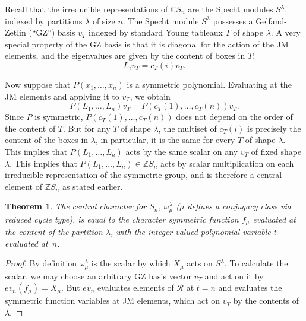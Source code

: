 \documentclass[10pt]{article}
\newtheorem{theorem}{Theorem}[section]
\theoremstyle{definition}
\begin{document}
Recall that the irreducible representations of $\mathbb{C}S_n$ are the Specht modules $S^\lambda$, indexed by partitions $\lambda$ of size $n$. The Specht module $S^\lambda$ possesses a Gelfand-Zetlin (``GZ'') basis $v_T$ indexed by standard Young tableaux $T$ of shape $\lambda$. A very special property of the GZ basis is that it is diagonal for the action of the JM elements, and the eigenvalues are given by the content of boxes in $T$:
\[
L_i v_T = c_T(i) v_T.
\]

Now suppose that $P(x_1, \ldots, x_n)$ is a symmetric polynomial. Evaluating at the JM elements and applying it to $v_T$, we obtain
\[
P(L_1, \ldots, L_n)v_T = P(c_T(1), \ldots, c_T(n))v_T.
\]
Since $P$ is symmetric, $P(c_T(1), \ldots, c_T(n))$ does not depend on the order of the content of $T$. But for any $T$ of shape $\lambda$, the multiset of $c_T(i)$ is precisely the content of the boxes in $\lambda$, in particular, it is the same for every $T$ of shape $\lambda$. This implies that $P(L_1, \ldots, L_n)$ acts by the same scalar on any $v_T$ of fixed shape $\lambda$. This implies that $P(L_1, \ldots, L_n) \in \mathbb{Z}S_n$ acts by scalar multiplication on each irreducible representation of the symmetric group, and is therefore a central element of $\mathbb{Z}S_n$ as stated earlier.

\begin{theorem} \label{sym_gp_eval_thm}
The central character for $S_n$, $\omega_\mu^\lambda$ \textup{(}$\mu$ defines a conjugacy class via reduced cycle type\textup{)}, is equal to the character symmetric function $f_\mu$ evaluated at the content of the partition $\lambda$, with the integer-valued polynomial variable $t$ evaluated at~$n$.
\end{theorem}
\begin{proof}
By definition $\omega_\mu^\lambda$ is the scalar by which $X_\mu$ acts on $S^\lambda$. To calculate the scalar, we may choose an arbitrary GZ basis vector $v_T$ and act on it by $ev_n(f_\mu) = X_\mu$. But $ev_n$ evaluates elements of $\mathcal{R}$ at $t=n$ and evaluates the symmetric function variables at JM elements, which act on $v_T$ by the contents of $\lambda$.
\end{proof}
\end{document}
